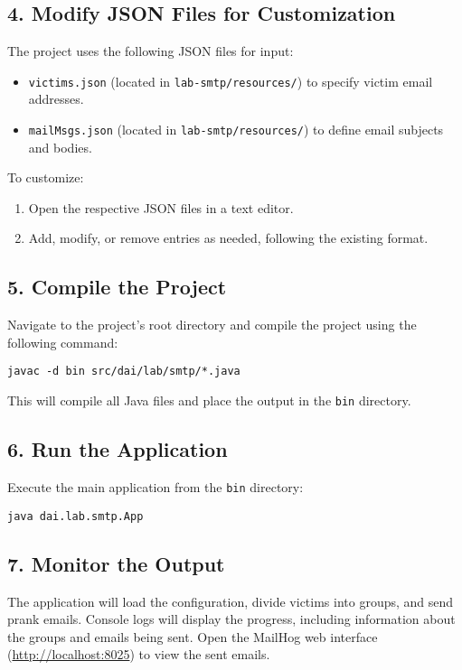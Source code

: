 \documentclass[a4paper,12pt]{article}
\begin{document}
\subsection*{4. Modify JSON Files for Customization}
The project uses the following JSON files for input:
\begin{itemize}
    \item \texttt{victims.json} (located in \texttt{lab-smtp/resources/}) to specify victim email addresses.
    \item \texttt{mailMsgs.json} (located in \texttt{lab-smtp/resources/}) to define email subjects and bodies.
\end{itemize}
To customize:
\begin{enumerate}
    \item Open the respective JSON files in a text editor.
    \item Add, modify, or remove entries as needed, following the existing format.
\end{enumerate}

\subsection*{5. Compile the Project}
Navigate to the project's root directory and compile the project using the following command:
\begin{verbatim}
javac -d bin src/dai/lab/smtp/*.java
\end{verbatim}
This will compile all Java files and place the output in the \texttt{bin} directory.

\subsection*{6. Run the Application}
Execute the main application from the \texttt{bin} directory:
\begin{verbatim}
java dai.lab.smtp.App
\end{verbatim}

\subsection*{7. Monitor the Output}
The application will load the configuration, divide victims into groups, and send prank emails. 
Console logs will display the progress, including information about the groups and emails being sent. 
Open the MailHog web interface (\url{http://localhost:8025}) to view the sent emails.
\end{document}

